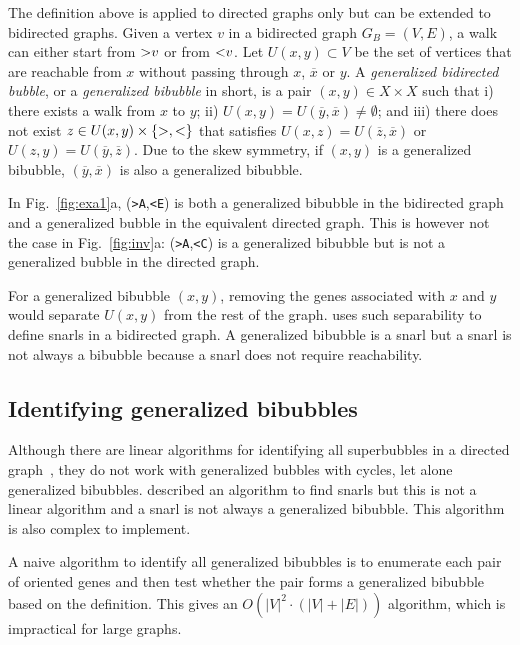 \documentclass[webpdf,contemporary,large,namedate]{oup-authoring-template}%
\begin{document}
The definition above is applied to directed graphs only but can be extended to bidirected graphs.
Given a vertex $v$ in a bidirected graph $G_B=(V,E)$,
a walk can either start from ${\rm >}v$ or from ${\rm <}v$.
Let $U(x,y)\subset V$ be the set of vertices that are reachable from $x$ without passing through $x$, $\overline{x}$ or $y$.
A \emph{generalized bidirected bubble}, or a \emph{generalized bibubble} in short, is a pair $(x,y)\in X\times X$ such that
i) there exists a walk from $x$ to $y$;
ii) $U(x,y)=U(\overline{y},\overline{x})\not=\emptyset$;
and iii) there does not exist $z\in U(x,y)\times\{{\rm >},{\rm <}\}$
that satisfies $U(x,z)=U(\overline{z},\overline{x})$ or $U(z,y)=U(\overline{y},\overline{z})$.
Due to the skew symmetry, if $(x,y)$ is a generalized bibubble, $(\overline{y},\overline{x})$ is also a generalized bibubble.

In Fig.~\ref{fig:exa1}a, ({\tt >A},{\tt <E}) is both a generalized bibubble in the bidirected graph
and a generalized bubble in the equivalent directed graph.
This is however not the case in Fig.~\ref{fig:inv}a:
({\tt >A},{\tt <C}) is a generalized bibubble but is not a generalized bubble in the directed graph.

For a generalized bibubble $(x,y)$, removing the genes associated with $x$ and $y$ would separate $U(x,y)$ from the rest of the graph.
\citet{Paten:2018aa} uses such separability to define snarls in a bidirected graph.
A generalized bibubble is a snarl but a snarl is not always a bibubble because a snarl does not require reachability.

\subsection{Identifying generalized bibubbles}

Although there are linear algorithms for identifying all superbubbles in a directed graph~\citep{DBLP:journals/corr/BrankovicIKMPV15},
they do not work with generalized bubbles with cycles, let alone generalized bibubbles.
\citet{Paten:2018aa} described an algorithm to find snarls but
this is not a linear algorithm and a snarl is not always a generalized bibubble.
This algorithm is also complex to implement.

A naive algorithm to identify all generalized bibubbles is to enumerate each pair of oriented genes
and then test whether the pair forms a generalized bibubble based on the definition.
This gives an $O(|V|^2\cdot(|V|+|E|))$ algorithm, which is impractical for large graphs.
\end{document}
